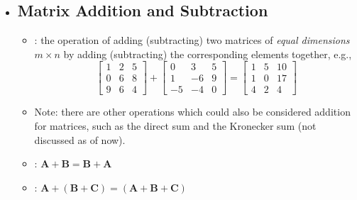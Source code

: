 \begin{itemize}
  \item []
  
  \subsection{Matrix Addition and Subtraction}\label{Matrix Addition and Subtraction}
  \begin{itemize}
    \item {}: the operation of adding (subtracting) two matrices of \emph{equal dimensions} \(m \times n\) by adding (subtracting) the corresponding elements together, e.g.,
    \[%
    \begin{bmatrix}
    1 & 2 & 5 \\
    0 & 6 & 8 \\
    9 & 6 & 4 
    \end{bmatrix} +
    \begin{bmatrix}
      0 & 3 & 5 \\
      1 & -6 & 9 \\
      -5 & -4 & 0 
    \end{bmatrix} 
    = 
    \begin{bmatrix}
    1 & 5 & 10 \\
    1 & 0 & 17 \\
    4 & 2 & 4 
    \end{bmatrix}
    \]%
    \item Note: there are other operations which could also be considered addition for matrices, such as the direct sum and the Kronecker sum (not discussed as of now).
    \item {}: \(\bm{A}+\bm{B} = \bm{B} + \bm{A}\)
    \item {}: \(\bm{A} + (\bm{B}+\bm{C}) = (\bm{A}+\bm{B}+ \bm{C})\)
  \end{itemize}


\end{itemize}
